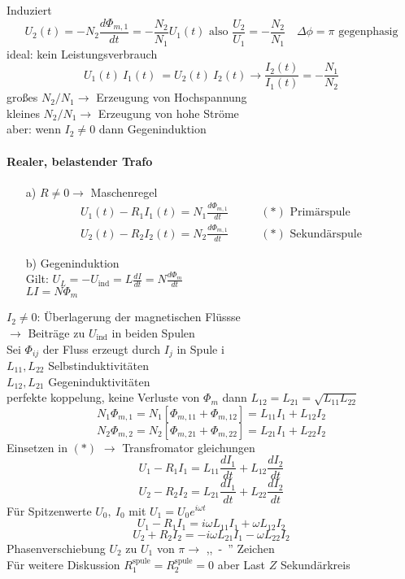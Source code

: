 \documentclass[titlepage,12pt,a4paper,ngerman]{report}
\newcommand{\tx}[1]{\textrm{#1}}
\newcommand{\uind}{U_{\tx{ind}}}
\begin{document}
Induziert $$U_2(t) = - N_2 \frac{d\Phi_{m,1}}{dt} = - \frac{N_2}{N_1} U_1(t) \tx{ also } \frac{U_2}{U_1} = -\frac{N_2}{N_1}\quad \Delta\phi = \pi \tx{ gegenphasig}$$
ideal: kein Leistungsverbrauch
$$U_1(t)\ I_1(t)\ = U_2 (t)\ I_2(t) \rightarrow \frac{I_2 (t)}{I_1 (t) } = -\frac{N_1}{N_2}$$
großes $N_2/N_1 \rightarrow$ Erzeugung von Hochspannung\\
kleines $N_2/N_1 \rightarrow$ Erzeugung von hohe Ströme\\
aber: wenn $I_2 \neq 0$ dann Gegeninduktion
\paragraph{Realer, belastender Trafo}
\begin{enumerate}
	\item[a)] $R\neq 0 \rightarrow $ Maschenregel
	\begin{align*}
 	U_1 (t) - R_1I_1(t) = N_1 \frac{d\Phi_{m,1}}{dt} \qquad &(*) \tx{ Primärspule}\\
	U_2 (t) - R_2I_2(t) = N_2 \frac{d\Phi_{m,1}}{dt}  \qquad &(*) \tx{ Sekundärspule}
	\end{align*}
	\item[b)] Gegeninduktion\\
	Gilt: $U_L = - \uind = L\frac{dI}{dt}= N \frac{d\Phi_m}{dt}$\\
	$LI = N\Phi_m$
	\end{enumerate}
$ I_2 \neq 0 $: Überlagerung der magnetischen Flüssse\\
$ \rightarrow $ Beiträge zu $ \uind $ in beiden Spulen\\
Sei $ \Phi_{ij} $ der Fluss erzeugt durch $ I_j $ in Spule i \\
$ L_{11},L_{22} $ Selbstinduktivitäten\\
$ L_{12},L_{21} $ Gegeninduktivitäten \\
perfekte koppelung, keine Verluste von $\Phi_m$ dann $L_{12} = L_{21} = \sqrt{L_{11}L_{22}}$
$$N_1 \Phi_{m,1} = N_1[\Phi_{m,11} + \Phi_{m,12}] = L_{11} I_1 + L_{12}I_2$$
$$N_2 \Phi_{m,2} = N_2[\Phi_{m,21} + \Phi_{m,22}] = L_{21} I_1 + L_{22}I_2$$
Einsetzen in $(*)$ $\rightarrow$ Transfromator gleichungen
$$U_1 - R_1 I_1 = L_{11} \frac{dI_1}{dt}+ L_{12} \frac{dI_2}{dt}$$
$$U_2 - R_2 I_2 = L_{21} \frac{dI_1}{dt}+ L_{22} \frac{dI_2}{dt}$$
Für Spitzenwerte $U_0,\ I_0$ mit $U_1 = U_0 e^{i\omega t}$
$$U_1 - R_1 I_1 = i\omega L_{11} I_1 + \omega L_{12} I_2$$
$$U_2 + R_2 I_2 = - i\omega L_{21} I_1 - \omega L_{22} I_2$$
Phasenverschiebung $U_2$ zu $U_1$ von $\pi \rightarrow$ ,,\ -\ '' Zeichen\\
Für weitere Diskussion $R^{\tx{spule}}_1 = R^{\tx{spule}}_2 = 0$ aber Last $Z$ Sekundärkreis
\end{document}
